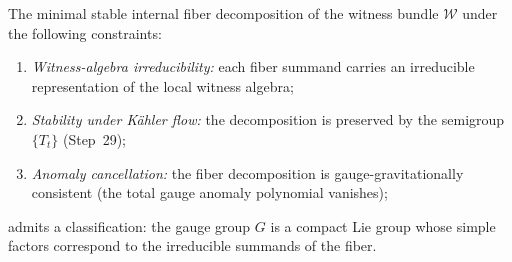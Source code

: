\begin{theorem}
\label{thm:fiber-decomposition}
The minimal stable internal fiber decomposition of the witness bundle
$\mathcal{W}$ under the following constraints:
\begin{enumerate}[nosep, label=\textnormal{(\roman*)}]
  \item \emph{Witness-algebra irreducibility:} each fiber summand carries
        an irreducible representation of the local witness algebra;
  \item \emph{Stability under K\"{a}hler flow:} the decomposition is
        preserved by the semigroup $\{T_t\}$ (Step~29);
  \item \emph{Anomaly cancellation:} the fiber decomposition is
        gauge-gravitationally consistent (the total gauge anomaly polynomial
        vanishes);
\end{enumerate}
admits a classification: the gauge group $G$ is a compact Lie group whose
simple factors correspond to the irreducible summands of the fiber.


\end{theorem}
